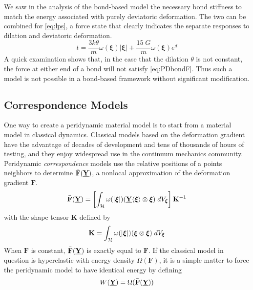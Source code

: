 %
We saw in the analysis of the bond-based model the necessary bond stiffness to match the energy associated with purely deviatoric deformation.
The two can be combined for \cref{eq:lps}, a force state that clearly indicates the separate responses to dilation and deviatoric deformation.
%
\begin{equation}
\label{eq:lps}
\underline{t} = \frac{3k\theta}{m}\omega(\boldsymbol{\xi})|\boldsymbol{\xi}| + \frac{15\;G}{m}\omega(\boldsymbol{\xi})\underline{e}^d
\end{equation}
%
A quick examination shows that, in the case that the dilation $\theta$ is not constant, the force at either end of a bond will not satisfy \cref{eq:PDbondF}.
Thus such a model is not possible in a bond-based framework without significant modification.

\subsection{Correspondence Models}
One way to create a peridynamic material model is to start from a material model in classical dynamics.
Classical models based on the deformation gradient have the advantage of decades of development and tens of thousands of hours of testing, and they enjoy widespread use in the continuum mechanics community.
Peridynamic \textit{correspondence} models use the relative positions of a points neighbors to determine $\bar{\mathbf{F}}(\vstate{Y}{}{})$, a nonlocal approximation of the deformation gradient $\mathbf{F}$.
%
\begin{equation}
\label{eq:PDapproxGradient}
\bar{\mathbf{F}}(\vstate{Y}{}{}) = \left[\int_\mathcal{H} \omega(|\boldsymbol{\xi}|)(\vstate{Y}{}{\boldsymbol{\xi}}\otimes \boldsymbol{\xi})\;dV_{\boldsymbol{\xi}} \right]\mathbf{K}^{-1}
\end{equation}
with the shape tensor $\mathbf{K}$ defined by
\begin{equation}
\mathbf{K} = \int_\mathcal{H}\omega(|\boldsymbol{\xi}|)(\boldsymbol{\xi} \otimes \boldsymbol{\xi})\;dV_{\boldsymbol{\xi}} \notag
\end{equation}
%
When $\mathbf{F}$ is constant, $\bar{\mathbf{F}}(\vstate{Y}{}{})$ is exactly equal to $\mathbf{F}$.
If the classical model in question is hyperelastic with energy density $\Omega(\mathbf{F})$, it is a simple matter to force the peridynamic model to have identical energy by defining
\begin{equation}
W(\vstate{Y}{}{}) = \Omega(\bar{\mathbf{F}}(\vstate{Y}{}{}))
\end{equation}
